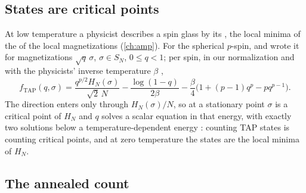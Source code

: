\begin{refsection}
\subsection{States are critical points}\label{sec:kacrice:tap}

At low temperature a physicist describes a spin glass by its , the local minima of the  of the local magnetizations (\cref{ch:amp}). For the spherical $p$-spin, \textcite{KurchanParisiVirasoro1993} and \textcite{CrisantiSommers1995} wrote it for magnetizations $\sqrt q\,\sigma$, $\sigma\in S_N$, $0\le q<1$; per spin, in our normalization and with the physicists' inverse temperature $\beta$ \parencite[eq.~(6.3)]{AuffingerBenArousCerny2013},
\begin{equation}\label{eq:kacrice:tap}
f_{\mathrm{TAP}}(q,\sigma)=\frac{q^{p/2}H_N(\sigma)}{\sqrt2\,N}-\frac{\log(1-q)}{2\beta}-\frac\beta4\bigl(1+(p-1)q^p-pq^{p-1}\bigr).
\end{equation}
The direction enters only through $H_N(\sigma)/N$, so at a stationary point $\sigma$ is a critical point of $H_N$ and $q$ solves a scalar equation in that energy, with exactly two solutions below a temperature-dependent energy \parencite[Section~6]{AuffingerBenArousCerny2013}: counting TAP states is counting critical points, and at zero temperature the states are the local minima of $H_N$.

\subsection{The annealed count}\label{sec:kacrice:annealed-physics}


\end{refsection}
